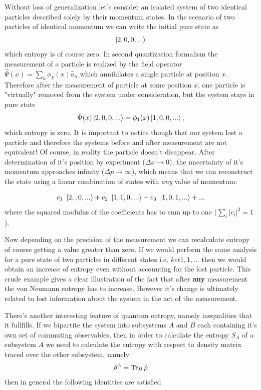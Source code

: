 \documentclass[a4paper,12pt]{article}
\begin{document}
Without loss of generalization let's consider an isolated system of two identical particles described solely by their momentum states.
In the scenario of two particles of identical momentum we can write the initial pure state as 
\begin{equation}
  \ket{2,0,0,...}
\end{equation}
which entropy is of course zero.  
In second quantization formalism the measurement of a particle is realized by the field operator $ \hat{\Psi}(x) =\sum_k \phi_k(x)\hat{a}_n$ which annihilates a single particle at position $x$.
Therefore after the measurement of particle at some position $x$, one particle is "virtually" removed from the system under consideration, but the system stays in pure state
\begin{equation}
  \hat{\Psi}(x)\ket{2,0,0,...}=\phi_1(x)\ket{1,0,0,...},
\end{equation}
which entropy is zero. It is important to notice though that our system lost a particle and therefore the systems before and after measurement are not equivalent! Of course, in reality the particle doesn't disappear. After determination of it's position by experiment ($\Delta x \to 0$), the uncertainty of it's momentum approaches infinity ($\Delta p \to \infty$), which means that we can reconstruct the state using a linear combination of states with \textit{any} value of momentum:

\begin{equation}
  c_1\ \ket{2,,0,...}+c_2\ \ket{1,1,0,...}+  c_3\ \ket{1,0,1,...}+...
\end{equation}
where the  squared modulus of the coefficients has to sum up to one ($ \sum_i \left| c_i \right|^2 = 1 $).

Now depending on the precision of the measurement we can recalculate entropy of course getting a value greater than zero. If we would perform the same analysis for a pure state of two particles in different states i.e. $ket{1,1,...}$ then we would obtain an increase of entropy even without accounting for the lost particle.
This crude example gives a clear illustration of the fact that after \textbf{any} measurement the von Neumann entropy has to increase. However it's change is ultimately related to lost information about the system in the act of the measurement.

There's another interesting feature of quantum entropy, namely inequalities that it fullfills.
If we bipartite the system into subsystems $A$ and $B$ each containing it's own set of commuting observables, then in order to calculate the entropy $S_A$ of a subsystem $A$ we need to calculate the entropy with respect to density matrix traced over the other subsystem, namely
\begin{equation}
  \hat{\rho}^A = \Tr_B \hat{\rho} 
\end{equation}
then in general the following identities are satisfied
\end{document}
